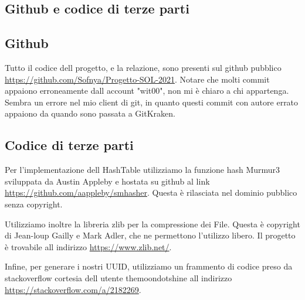 \documentclass[11pt]{article}
\begin{document}
\begin{flushleft}
\section{Github e codice di terze parti}
\subsection{Github}
Tutto il codice dell progetto, e la relazione, sono presenti sul github pubblico \url{https://github.com/Sofnya/Progetto-SOL-2021}.
Notare che molti commit appaiono erroneamente dall account "wit00", non mi è chiaro a chi appartenga. Sembra un errore nel mio client di git, in quanto questi commit con autore errato appaiono da quando sono passata a GitKraken.

\subsection{Codice di terze parti}
Per l'implementazione dell HashTable utilizziamo la funzione hash Murmur3 sviluppata da Austin Appleby e hostata su github al link \url{https://github.com/aappleby/smhasher}. Questa è rilasciata nel dominio pubblico senza copyright.

Utilizziamo inoltre la libreria zlib per la compressione dei File. Questa è copyright di Jean-loup Gailly e Mark Adler, che ne permettono l'utilizzo libero. Il progetto è trovabile all indirizzo \url{https://www.zlib.net/}.

Infine, per generare i nostri UUID, utilizziamo un frammento di codice preso da stackoverflow cortesia dell utente themoondotshine all indirizzo \url{https://stackoverflow.com/a/2182269}.

\end{flushleft}
\end{document}
